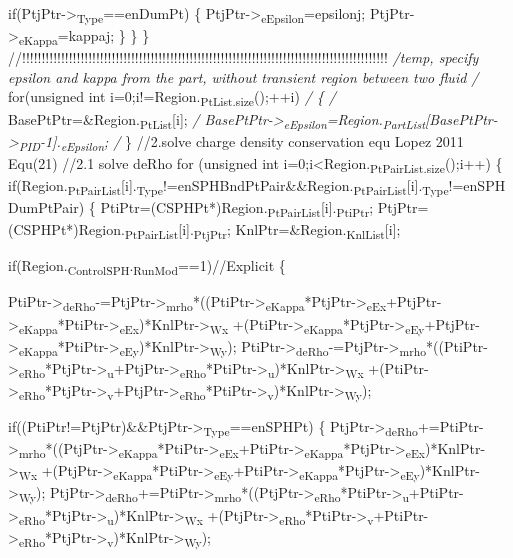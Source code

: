 \documentclass[presentation]{beamer}
\begin{document}
      if(PtjPtr->\textsubscript{Type}==enDumPt)
        \{
          PtjPtr->\textsubscript{eEpsilon}=epsilonj;
          PtjPtr->\textsubscript{eKappa}=kappaj;
        \}
    \}
  \}
//!!!!!!!!!!!!!!!!!!!!!!!!!!!!!!!!!!!!!!!!!!!!!!!!!!!!!!!!!!!!!!!!!!!!!!!!!!!!!!!!!!!!!!!!!!!!!!
\emph{/temp, specify epsilon and kappa from the part, without transient region between two fluid
/} for(unsigned int i=0;i!=Region.\textsubscript{PtList.size}();++i)
\emph{/ \{
/}   BasePtPtr=\&Region.\textsubscript{PtList}[i];
\emph{/   BasePtPtr->\textsubscript{eEpsilon}=Region.\textsubscript{PartList}[BasePtPtr->\textsubscript{PID}-1].\textsubscript{eEpsilon};
/} \}
//2.solve charge density conservation equ Lopez 2011 Equ(21)
//2.1 solve deRho
for (unsigned int i=0;i<Region.\textsubscript{PtPairList.size}();i++)
  \{
    if(Region.\textsubscript{PtPairList}[i].\textsubscript{Type}!=enSPHBndPtPair\&\&Region.\textsubscript{PtPairList}[i].\textsubscript{Type}!=enSPHDumPtPair)
      \{
        PtiPtr=(CSPHPt*)Region.\textsubscript{PtPairList}[i].\textsubscript{PtiPtr};
        PtjPtr=(CSPHPt*)Region.\textsubscript{PtPairList}[i].\textsubscript{PtjPtr};
        KnlPtr=\&Region.\textsubscript{KnlList}[i];

if(Region.\textsubscript{ControlSPH}.\textsubscript{RunMod}==1)//Explicit
  \{

PtiPtr->\textsubscript{deRho}-=PtjPtr->\textsubscript{mrho}*((PtiPtr->\textsubscript{eKappa}*PtjPtr->\textsubscript{eEx}+PtjPtr->\textsubscript{eKappa}*PtiPtr->\textsubscript{eEx})*KnlPtr->\textsubscript{Wx}
                               +(PtiPtr->\textsubscript{eKappa}*PtjPtr->\textsubscript{eEy}+PtjPtr->\textsubscript{eKappa}*PtiPtr->\textsubscript{eEy})*KnlPtr->\textsubscript{Wy});
PtiPtr->\textsubscript{deRho}-=PtjPtr->\textsubscript{mrho}*((PtiPtr->\textsubscript{eRho}*PtjPtr->\textsubscript{u}+PtjPtr->\textsubscript{eRho}*PtiPtr->\textsubscript{u})*KnlPtr->\textsubscript{Wx}
                               +(PtiPtr->\textsubscript{eRho}*PtjPtr->\textsubscript{v}+PtjPtr->\textsubscript{eRho}*PtiPtr->\textsubscript{v})*KnlPtr->\textsubscript{Wy});

if((PtiPtr!=PtjPtr)\&\&PtjPtr->\textsubscript{Type}==enSPHPt)
  \{
    PtjPtr->\textsubscript{deRho}+=PtiPtr->\textsubscript{mrho}*((PtjPtr->\textsubscript{eKappa}*PtiPtr->\textsubscript{eEx}+PtiPtr->\textsubscript{eKappa}*PtjPtr->\textsubscript{eEx})*KnlPtr->\textsubscript{Wx}
                                   +(PtjPtr->\textsubscript{eKappa}*PtiPtr->\textsubscript{eEy}+PtiPtr->\textsubscript{eKappa}*PtjPtr->\textsubscript{eEy})*KnlPtr->\textsubscript{Wy});
    PtjPtr->\textsubscript{deRho}+=PtiPtr->\textsubscript{mrho}*((PtjPtr->\textsubscript{eRho}*PtiPtr->\textsubscript{u}+PtiPtr->\textsubscript{eRho}*PtjPtr->\textsubscript{u})*KnlPtr->\textsubscript{Wx}
                                   +(PtjPtr->\textsubscript{eRho}*PtiPtr->\textsubscript{v}+PtiPtr->\textsubscript{eRho}*PtjPtr->\textsubscript{v})*KnlPtr->\textsubscript{Wy});
\end{document}
